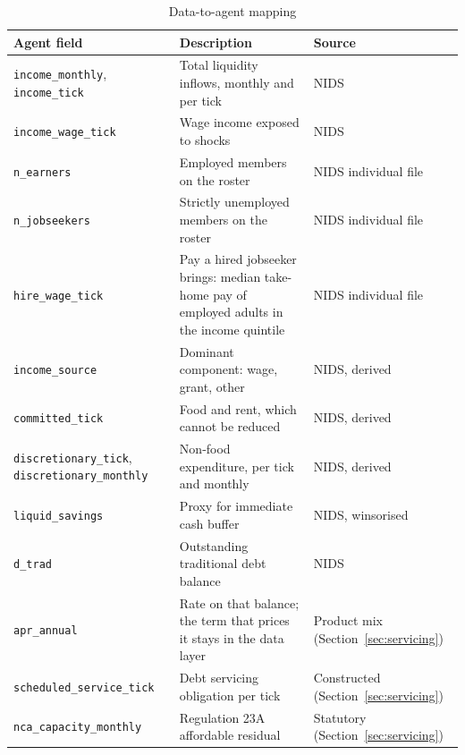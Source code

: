 \begin{table}[p]
\centering
\caption{Data-to-agent mapping}
\label{tab:agent-mapping}
\begingroup\footnotesize
\begin{tabular}{H{4.25cm}L{6.0cm}L{3.15cm}}
\toprule
\textbf{Agent field} & \textbf{Description} & \textbf{Source} \\
\midrule
\texttt{income\_monthly}, \texttt{income\_tick} & Total liquidity inflows, monthly and per tick & NIDS \\
\addlinespace
\texttt{income\_wage\_tick} & Wage income exposed to shocks & NIDS \\
\addlinespace
\texttt{n\_earners} & Employed members on the roster & NIDS individual file \\
\addlinespace
\texttt{n\_jobseekers} & Strictly unemployed members on the roster & NIDS individual file \\
\addlinespace
\texttt{hire\_wage\_tick} & Pay a hired jobseeker brings: median take-home pay of employed adults in the income quintile & NIDS individual file \\
\addlinespace
\texttt{income\_source} & Dominant component: wage, grant, other & NIDS, derived \\
\addlinespace
\texttt{committed\_tick} & Food and rent, which cannot be reduced & NIDS, derived \\
\addlinespace
\texttt{discretionary\_tick}, \texttt{discretionary\_monthly} & Non-food expenditure, per tick and monthly & NIDS, derived \\
\addlinespace
\texttt{liquid\_savings} & Proxy for immediate cash buffer & NIDS, winsorised \\
\addlinespace
\texttt{d\_trad} & Outstanding traditional debt balance & NIDS \\
\addlinespace
\texttt{apr\_annual} & Rate on that balance; the term that prices it stays in the data layer & Product mix (Section~\ref{sec:servicing}) \\
\addlinespace
\texttt{scheduled\_service\_tick} & Debt servicing obligation per tick & Constructed (Section~\ref{sec:servicing}) \\
\addlinespace
\texttt{nca\_capacity\_monthly} & Regulation 23A affordable residual & Statutory (Section~\ref{sec:servicing}) \\

\end{tabular}
\end{table}
